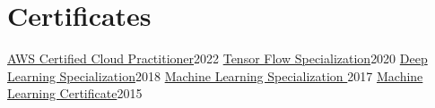 \section{Certificates}
\resumeSubHeadingListStart
\resumeSubheading
{\href{https://www.credly.com/badges/5d150ca0-aa46-49ee-b12e-2bbaa10ab51f/}{AWS Certified Cloud Practitioner}}{2022}{}{}
\resumeSubheading
{\href{https://www.coursera.org/account/accomplishments/specialization/certificate/6TK3DERRF3Y5}{Tensor Flow Specialization}}{2020}{}{}
\resumeSubheading
{\href{https://www.coursera.org/account/accomplishments/specialization/9C4WM5Y3CHLL}{Deep Learning Specialization}}{2018}{}{}
\resumeSubheading
{\href{https://www.coursera.org/account/accomplishments/specialization/certificate/75H6XBPR5J45}{Machine Learning Specialization }}{2017}{}{}
\resumeSubheading
{\href{https://www.coursera.org/account/accomplishments/verify/EA5XJXMARBTU}{Machine Learning Certificate}}{2015}{}{}
\resumeSubHeadingListEnd
\vspace{-15pt}
